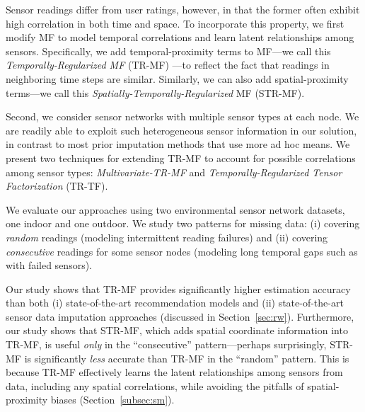 Sensor readings differ from user ratings, however, in that the former
often exhibit high correlation in both time and space.
To incorporate this property, we first modify MF
to model temporal correlations and learn latent relationships among
sensors.  Specifically, we add temporal-proximity terms to
MF---we call this {\em Temporally-Regularized MF} (TR-MF)
---to reflect the fact that readings in neighboring time steps are similar.
Similarly, we can also add spatial-proximity terms---we 
call this {\em Spatially-Temporally-Regularized} MF (STR-MF).

Second, we consider sensor networks with multiple sensor types at each node.
We are readily able to exploit such heterogeneous sensor information in our
solution, in contrast to most prior imputation methods that use more ad hoc means.
We present two techniques for extending 
TR-MF to account for possible correlations among sensor types: {\em Multivariate-TR-MF} and 
{\em Temporally-Regularized Tensor Factorization} (TR-TF).

We evaluate our approaches using two environmental sensor network
datasets, one indoor and one outdoor.
We study two patterns for missing data: (i) covering
{\em random} readings (modeling intermittent reading failures) and (ii)
covering {\em consecutive} readings for some sensor nodes
(modeling long temporal gaps such as with failed sensors).

Our study shows that TR-MF provides significantly higher estimation accuracy than 
both (i) state-of-the-art recommendation models and (ii) state-of-the-art sensor data imputation approaches 
(discussed in Section~\ref{sec:rw}).
Furthermore, our study shows that STR-MF, which adds spatial
coordinate information into TR-MF, is useful {\em only} in the
``consecutive'' pattern---perhaps surprisingly, STR-MF is
significantly {\em less} accurate than TR-MF in the ``random''
pattern.  This is because TR-MF effectively learns the latent
relationships among sensors from data, including any spatial correlations, while
avoiding the pitfalls of spatial-proximity biases (Section~\ref{subsec:sm}).


